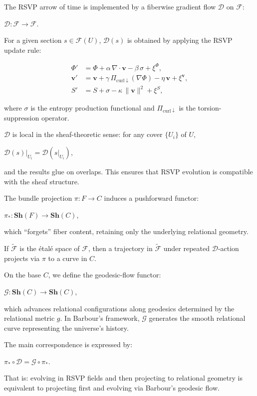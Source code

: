 \documentclass[11pt]{article}
\theoremstyle{plain}
\theoremstyle{definition}
\begin{document}
The RSVP arrow of time is implemented by a fiberwise gradient flow $\mathcal{D}$ on $\mathscr{F}$:

$\mathcal{D} : \mathscr{F} \to \mathscr{F}$.

For a given section $s \in \mathscr{F}(U)$, $\mathcal{D}(s)$ is obtained by applying the RSVP update rule:

\begin{align*}
\Phi' &= \Phi + \alpha\,\nabla\!\cdot \mathbf{v} - \beta\,\sigma + \xi^\Phi, \\
\mathbf{v}' &= \mathbf{v} + \gamma\,\Pi_{\mathrm{curl\downarrow}}(\nabla\Phi) - \eta\,\mathbf{v} + \xi^{\mathbf{v}}, \\
S' &= S + \sigma - \kappa\,\|\mathbf{v}\|^2 + \xi^S ,
\end{align*}

where $\sigma$ is the entropy production functional and $\Pi_{\mathrm{curl\downarrow}}$ is the torsion-suppression operator.

$\mathcal{D}$ is local in the sheaf-theoretic sense: for any cover $\{U_i\}$ of $U$,

$\mathcal{D}(s)|_{U_i} = \mathcal{D}(s|_{U_i})$,

and the results glue on overlaps. This ensures that RSVP evolution is compatible with the sheaf structure.

The bundle projection $\pi: F \to C$ induces a pushforward functor:

$\pi_* : \mathbf{Sh}(F) \to \mathbf{Sh}(C)$,

which “forgets” fiber content, retaining only the underlying relational geometry.

If $\widetilde{\mathscr{F}}$ is the étalé space of $\mathscr{F}$, then a trajectory in $\widetilde{\mathscr{F}}$ under repeated $\mathcal{D}$-action projects via $\pi$ to a curve in $C$.

On the base $C$, we define the geodesic-flow functor:

$\mathcal{G}: \mathbf{Sh}(C) \to \mathbf{Sh}(C)$,

which advances relational configurations along geodesics determined by the relational metric $g$. In Barbour’s framework, $\mathcal{G}$ generates the smooth relational curve representing the universe’s history.

The main correspondence is expressed by:

$\pi_* \circ \mathcal{D} = \mathcal{G} \circ \pi_*$.

That is: evolving in RSVP fields and then projecting to relational geometry is equivalent to projecting first and evolving via Barbour’s geodesic flow.
\end{document}
